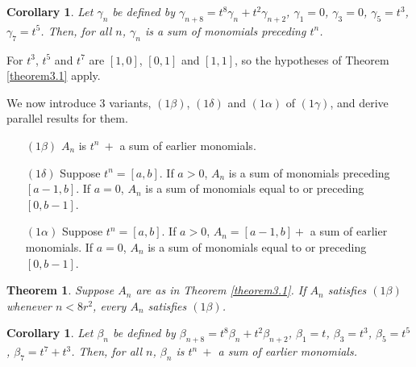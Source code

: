 \documentclass{monsky2009}
\newtheorem{theorem}[definition]{Theorem}
\newtheorem{corollary}[definition]{Corollary}
\begin{document}
\begin{corollary}%
\label{corollary3.2}
Let $\gamma_{n}$ be defined by $\gamma_{n+8}=t^{8}\gamma_{n}+t^{2}\gamma_{n+2}$, $\gamma_{1}=0$, $\gamma_{3}=0$, $\gamma_{5}=t^{3}$, $\gamma_{7}=t^{5}$. Then, for all $n$, $\gamma_{n}$ is a sum of monomials preceding $t^{n}$.
\end{corollary}

For $t^{3}$, $t^{5}$ and $t^{7}$ are $[1,0]$, $[0,1]$ and $[1,1]$, so the hypotheses of Theorem \ref{theorem3.1} apply.

We now introduce 3 variants, $(1\beta)$, $(1\delta)$ and $(1\alpha)$ of $(1\gamma)$, and derive parallel results for them.

\begin{enumerate}
\item[$(1\beta)$] $A_{n}$ is $t^{n}\ +$ a sum of earlier monomials.
\item[$(1\delta)$] Suppose $t^{n}=[a,b]$. If $a>0$, $A_{n}$ is a sum of monomials preceding $[a-1,b]$. If $a=0$, $A_{n}$ is a sum of monomials equal to or preceding $[0,b-1]$.
\item[$(1\alpha)$] Suppose $t^{n}=[a,b]$. If $a>0$, $A_{n}=[a-1,b]+$  a sum of earlier monomials. If $a=0$, $A_{n}$ is a sum of monomials equal to or preceding $[0,b-1]$.
\end{enumerate}

\begin{theorem}
\label{theorem3.3}
Suppose $A_{n}$ are as in Theorem \ref{theorem3.1}. If $A_{n}$ satisfies $(1\beta)$ whenever $n<8r^{2}$, every $A_{n}$ satisfies $(1\beta)$.
\end{theorem}

\begin{corollary}%
\label{corollary3.4}
Let $\beta_{n}$ be defined by $\beta_{n+8}=t^{8}\beta_{n}+t^{2}\beta_{n+2}$, $\beta_{1}=t$, $\beta_{3}=t^{3}$, $\beta_{5}=t^{5}$, $\beta_{7}=t^{7}+t^{3}$. Then, for all $n$, $\beta_{n}$ is $t^{n}\ +$ a sum of earlier monomials.
\end{corollary}
\end{document}
